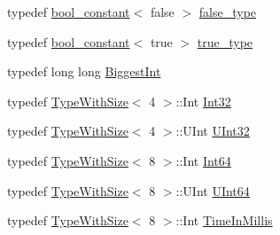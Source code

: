 \begin{DoxyCompactItemize}
\item 
typedef \hyperlink{structtesting_1_1internal_1_1bool__constant}{bool\+\_\+constant}$<$ false $>$ \hyperlink{namespacetesting_1_1internal_abb1d0789f19bdde21affccbd1078b525}{false\+\_\+type}
\item 
typedef \hyperlink{structtesting_1_1internal_1_1bool__constant}{bool\+\_\+constant}$<$ true $>$ \hyperlink{namespacetesting_1_1internal_a62f917c3424d8841de9b49b5ec28edb4}{true\+\_\+type}
\item 
typedef long long \hyperlink{namespacetesting_1_1internal_a05c6bd9ede5ccdf25191a590d610dcc6}{Biggest\+Int}
\item 
typedef \hyperlink{classtesting_1_1internal_1_1_type_with_size}{Type\+With\+Size}$<$ 4 $>$\+::Int \hyperlink{namespacetesting_1_1internal_a8ee38faaf875f133358abaf9bc056cec}{Int32}
\item 
typedef \hyperlink{classtesting_1_1internal_1_1_type_with_size}{Type\+With\+Size}$<$ 4 $>$\+::U\+Int \hyperlink{namespacetesting_1_1internal_a40d4fffcd2bf56f18b1c380615aa85e3}{U\+Int32}
\item 
typedef \hyperlink{classtesting_1_1internal_1_1_type_with_size}{Type\+With\+Size}$<$ 8 $>$\+::Int \hyperlink{namespacetesting_1_1internal_a271c563fec38b804ddab0677f51f70a8}{Int64}
\item 
typedef \hyperlink{classtesting_1_1internal_1_1_type_with_size}{Type\+With\+Size}$<$ 8 $>$\+::U\+Int \hyperlink{namespacetesting_1_1internal_aa6a1ac454e6d7e550fa4925c62c35caa}{U\+Int64}
\item 
typedef \hyperlink{classtesting_1_1internal_1_1_type_with_size}{Type\+With\+Size}$<$ 8 $>$\+::Int \hyperlink{namespacetesting_1_1internal_a66a845df404b38fe85c5e14a069f255a}{Time\+In\+Millis}
\end{DoxyCompactItemize}
